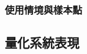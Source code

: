 \subsubsection{使用情境與樣本點}
\label{chp:scenario}

\subsection{量化系統表現}
\label{chp:evaluate_method}







